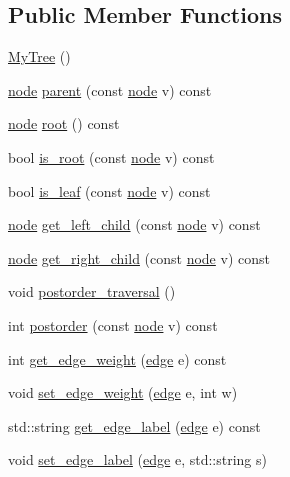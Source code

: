 \subsection*{Public Member Functions}
\begin{DoxyCompactItemize}
\item 
\mbox{\hyperlink{class_my_tree_a18f3e28586b77d44f5f2c12155d6794b}{My\+Tree}} ()
\item 
\mbox{\hyperlink{classnode}{node}} \mbox{\hyperlink{class_my_tree_a6dd1940094f32e411a4107c01a6997fb}{parent}} (const \mbox{\hyperlink{classnode}{node}} v) const
\item 
\mbox{\hyperlink{classnode}{node}} \mbox{\hyperlink{class_my_tree_a04b0f390bb74c3bdb157cad08872076e}{root}} () const
\item 
bool \mbox{\hyperlink{class_my_tree_a2590ac659aafc07741ee8bb28b457f54}{is\+\_\+root}} (const \mbox{\hyperlink{classnode}{node}} v) const
\item 
bool \mbox{\hyperlink{class_my_tree_af4cde35ddb02e57b451d34e83d9cc626}{is\+\_\+leaf}} (const \mbox{\hyperlink{classnode}{node}} v) const
\item 
\mbox{\hyperlink{classnode}{node}} \mbox{\hyperlink{class_my_tree_ad24d047e2da5b363401a74977cde423c}{get\+\_\+left\+\_\+child}} (const \mbox{\hyperlink{classnode}{node}} v) const
\item 
\mbox{\hyperlink{classnode}{node}} \mbox{\hyperlink{class_my_tree_a5daf167d4bab0c1b0ca9b25cd3c45065}{get\+\_\+right\+\_\+child}} (const \mbox{\hyperlink{classnode}{node}} v) const
\item 
void \mbox{\hyperlink{class_my_tree_ac375615ebccedd180aee25c5ea3f8ef1}{postorder\+\_\+traversal}} ()
\item 
int \mbox{\hyperlink{class_my_tree_a127a65f7b2ed2c17f84e2876281712bc}{postorder}} (const \mbox{\hyperlink{classnode}{node}} v) const
\item 
int \mbox{\hyperlink{class_my_graph_aed4da227ae0cfe5565fa23acb4c4776c}{get\+\_\+edge\+\_\+weight}} (\mbox{\hyperlink{classedge}{edge}} e) const
\item 
void \mbox{\hyperlink{class_my_graph_a798846d9c09d7d5b49db3c75fb1f7f38}{set\+\_\+edge\+\_\+weight}} (\mbox{\hyperlink{classedge}{edge}} e, int w)
\item 
std\+::string \mbox{\hyperlink{class_my_graph_ae6bb4074fb50ab3f3bd811e64621b9fc}{get\+\_\+edge\+\_\+label}} (\mbox{\hyperlink{classedge}{edge}} e) const
\item 
void \mbox{\hyperlink{class_my_graph_a66d63b8b481c36437061989a868df064}{set\+\_\+edge\+\_\+label}} (\mbox{\hyperlink{classedge}{edge}} e, std\+::string s)

\end{DoxyCompactItemize}

